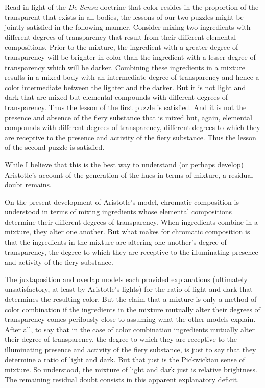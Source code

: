 Read in light of the \emph{De Sensu} doctrine that color resides in the proportion of the transparent that exists in all bodies, the lessons of our two puzzles might be jointly satisfied in the following manner. Consider mixing two ingredients with different degrees of transparency that result from their different elemental compositions. Prior to the mixture, the ingredient with a greater degree of transparency will be brighter in color than the ingredient with a lesser degree of transparency which will be darker. Combining these ingredients in a mixture results in a mixed body with an intermediate degree of transparency and hence a color intermediate between the lighter and the darker. But it is not light and dark that are mixed but elemental compounds with different degrees of transparency. Thus the lesson of the first puzzle is satisfied. And it is not the presence and absence of the fiery substance that is mixed but, again, elemental compounds with different degrees of transparency, different degrees to which they are receptive to the presence and activity of the fiery substance. Thus the lesson of the second puzzle is satisfied.

While I believe that this is the best way to understand (or perhaps develop) Aristotle's account of the generation of the hues in terms of mixture, a residual doubt remains. 

On the present development of Aristotle's model, chromatic composition is understood in terms of mixing ingredients whose elemental compositions determine their different degrees of transparency. When ingredients combine in a mixture, they alter one another. But what makes for chromatic composition is that the ingredients in the mixture are altering one another's degree of transparency, the degree to which they are receptive to the illuminating presence and activity of the fiery substance. 

The juxtaposition and overlap models each provided explanations (ultimately unsatisfactory, at least by Aristotle's lights) for the ratio of light and dark that determines the resulting color. But the claim that a mixture is only a method of color combination if the ingredients in the mixture mutually alter their degrees of transparency comes perilously close to assuming what the other models explain. After all, to say that in the case of color combination ingredients mutually alter their degree of transparency, the degree to which they are receptive to the illuminating presence and activity of the fiery substance, is just to say that they determine a ratio of light and dark. But that just is the Pickwickian sense of mixture. So understood, the mixture of light and dark just is relative brightness. The remaining residual doubt consists in this apparent explanatory deficit. 


